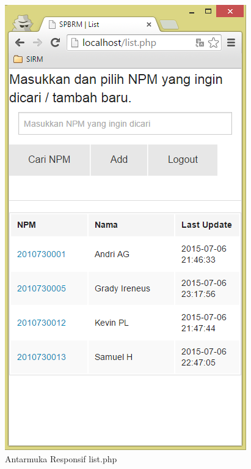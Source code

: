\begin{figure}[H]
\centering
\includegraphics[scale=0.44]{Gambar/pengujian23.png}
\caption[Antarmuka Responsif list.php]{Antarmuka Responsif list.php} 
\label{fig:responsiflist}
\end{figure}

